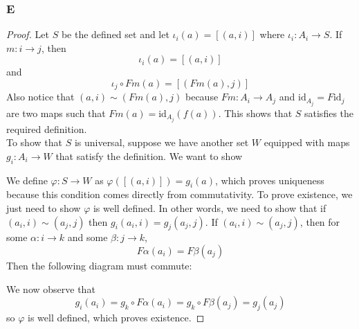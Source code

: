 \documentclass{article}
\newcommand{\id}{\mathrm{id}}
\begin{document}
\subsubsection{E}\label{1.4.E}
\begin{proof}
    Let $S$ be the defined set and let $\iota_i(a)=[(a,i)]$ where $\iota_i:A_i\to S$. If $m:i\to j$, then
    \[
    \iota_i(a)=[(a,i)]
    \]
    and
    \[
    \iota_j\circ Fm(a)=[(Fm(a),j)]
    \]
    Also notice that $(a,i)\sim (Fm(a),j)$ because $Fm:A_i\to A_j$ and $\id_{A_j}=F\id_j$ are two maps such that $Fm(a)=\id_{A_j}(f(a))$. This shows that $S$ satisfies the required definition.\\
    \newline
    To show that $S$ is universal, suppose we have another set $W$ equipped with maps $g_i:A_i\to W$ that satisfy the definition. We want to show
    \begin{center}
    \end{center}
    We define $\varphi:S\to W$ as $\varphi([(a,i)])=g_i(a)$, which proves uniqueness because this condition comes directly from commutativity. To prove existence, we just need to show $\varphi$ is well defined. In other words, we need to show that if $(a_i,i)\sim (a_j,j)$ then $g_i(a_i,i)=g_j(a_j,j)$. If $(a_i,i)\sim (a_j,j)$, then for some $\alpha:i\to k$ and some $\beta:j\to k$,
    \[
    F\alpha(a_i)=F\beta(a_j)
    \]
    Then the following diagram must commute:
    \begin{center}
    \end{center}
    We now observe that
    \[
    g_i(a_i)=g_k\circ F\alpha(a_i)=g_k\circ F\beta(a_j)=g_j(a_j)
    \]
    so $\varphi$ is well defined, which proves existence.
\end{proof}
\end{document}
